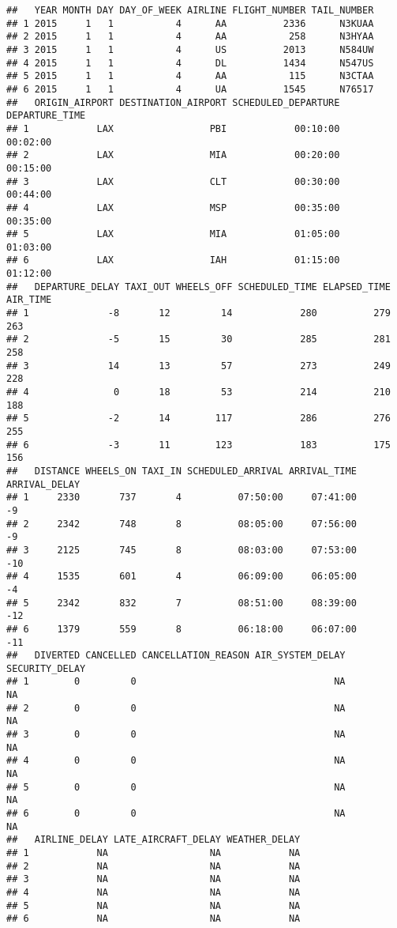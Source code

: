 \documentclass[]{article}
\begin{document}
\begin{verbatim}
##   YEAR MONTH DAY DAY_OF_WEEK AIRLINE FLIGHT_NUMBER TAIL_NUMBER
## 1 2015     1   1           4      AA          2336      N3KUAA
## 2 2015     1   1           4      AA           258      N3HYAA
## 3 2015     1   1           4      US          2013      N584UW
## 4 2015     1   1           4      DL          1434      N547US
## 5 2015     1   1           4      AA           115      N3CTAA
## 6 2015     1   1           4      UA          1545      N76517
##   ORIGIN_AIRPORT DESTINATION_AIRPORT SCHEDULED_DEPARTURE DEPARTURE_TIME
## 1            LAX                 PBI            00:10:00       00:02:00
## 2            LAX                 MIA            00:20:00       00:15:00
## 3            LAX                 CLT            00:30:00       00:44:00
## 4            LAX                 MSP            00:35:00       00:35:00
## 5            LAX                 MIA            01:05:00       01:03:00
## 6            LAX                 IAH            01:15:00       01:12:00
##   DEPARTURE_DELAY TAXI_OUT WHEELS_OFF SCHEDULED_TIME ELAPSED_TIME AIR_TIME
## 1              -8       12         14            280          279      263
## 2              -5       15         30            285          281      258
## 3              14       13         57            273          249      228
## 4               0       18         53            214          210      188
## 5              -2       14        117            286          276      255
## 6              -3       11        123            183          175      156
##   DISTANCE WHEELS_ON TAXI_IN SCHEDULED_ARRIVAL ARRIVAL_TIME ARRIVAL_DELAY
## 1     2330       737       4          07:50:00     07:41:00            -9
## 2     2342       748       8          08:05:00     07:56:00            -9
## 3     2125       745       8          08:03:00     07:53:00           -10
## 4     1535       601       4          06:09:00     06:05:00            -4
## 5     2342       832       7          08:51:00     08:39:00           -12
## 6     1379       559       8          06:18:00     06:07:00           -11
##   DIVERTED CANCELLED CANCELLATION_REASON AIR_SYSTEM_DELAY SECURITY_DELAY
## 1        0         0                                   NA             NA
## 2        0         0                                   NA             NA
## 3        0         0                                   NA             NA
## 4        0         0                                   NA             NA
## 5        0         0                                   NA             NA
## 6        0         0                                   NA             NA
##   AIRLINE_DELAY LATE_AIRCRAFT_DELAY WEATHER_DELAY
## 1            NA                  NA            NA
## 2            NA                  NA            NA
## 3            NA                  NA            NA
## 4            NA                  NA            NA
## 5            NA                  NA            NA
## 6            NA                  NA            NA
\end{verbatim}
\end{document}

